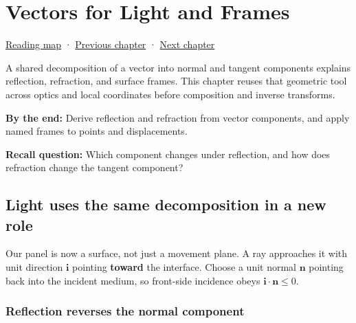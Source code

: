 \chapter{Vectors for Light and Frames}\label{01-foundations-i-ch018-vectors-for-light-and-frames}\hypertarget{01-foundations-i-ch018}{}\label{stagechapter:01-foundations-i-ch018}

\hypertarget{01-foundations-i-ch018-vectors-for-light-and-frames}{}

\hyperref[volume-reading-map]{Reading map} · \hyperref[01-foundations-i-ch017-python-and-numerical-tools-for-graphics-systems]{Previous chapter} · \hyperref[01-foundations-i-ch019-coordinate-frames-and-linear-systems]{Next chapter}

A shared decomposition of a vector into normal and tangent components explains reflection, refraction, and surface frames. This chapter reuses that geometric tool across optics and local coordinates before composition and inverse transforms.

\textbf{By the end:} Derive reflection and refraction from vector components, and apply named frames to points and displacements.

\textbf{Recall question:} Which component changes under reflection, and how does refraction change the tangent component?

\section{Light uses the same decomposition in a new role}\label{01-foundations-i-ch018-light-uses-the-same-decomposition-in-a-new-role}

\hypertarget{01-foundations-i-ch018-light-uses-the-same-decomposition-in-a-new-role}{}

Our panel is now a surface, not just a movement plane. A ray approaches it with unit direction \(\mathbf i\) pointing \textbf{toward} the interface. Choose a unit normal \(\mathbf n\) pointing back into the incident medium, so front-side incidence obeys \(\mathbf i\cdot\mathbf n\le0\).

\subsection{Reflection reverses the normal component}\label{01-foundations-i-ch018-reflection-reverses-the-normal-component}

\hypertarget{01-foundations-i-ch018-reflection-reverses-the-normal-component}{}

